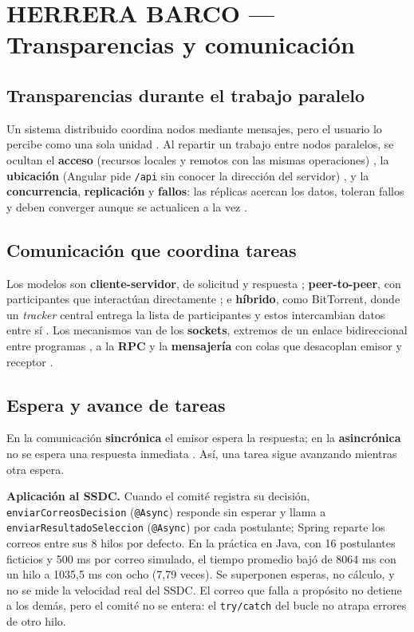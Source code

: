 \section*{HERRERA BARCO — Transparencias y comunicación}

\subsection*{Transparencias durante el trabajo paralelo}
Un sistema distribuido coordina nodos mediante mensajes, pero el usuario lo
percibe como una sola unidad \cite{hbFreitas2025}. Al repartir un trabajo
entre nodos paralelos, se ocultan el \textbf{acceso} (recursos locales y
remotos con las mismas operaciones) \cite{hbArjona2023}, la
\textbf{ubicación} (Angular pide \texttt{/api} sin conocer la dirección del
servidor) \cite{hbAngularProxy}, y la \textbf{concurrencia},
\textbf{replicación} y \textbf{fallos}: las réplicas acercan los datos, toleran
fallos y deben converger aunque se actualicen a la vez \cite{hbFreitas2025}.

\subsection*{Comunicación que coordina tareas}
Los modelos son \textbf{cliente-servidor}, de solicitud y respuesta
\cite{hbSimoes2026}; \textbf{peer-to-peer}, con participantes que interactúan
directamente \cite{hbSaleh2025}; e \textbf{híbrido}, como BitTorrent, donde un
\emph{tracker} central entrega la lista de participantes y estos intercambian
datos entre sí \cite{hbBep3}. Los mecanismos van de los \textbf{sockets},
extremos de un enlace bidireccional entre programas \cite{hbOracleSockets}, a
la \textbf{RPC} \cite{hbSimoes2026} y la \textbf{mensajería} con colas que
desacoplan emisor y receptor \cite{hbSaleh2025}.

\subsection*{Espera y avance de tareas}
En la comunicación \textbf{sincrónica} el emisor espera la respuesta; en la
\textbf{asincrónica} no se espera una respuesta inmediata \cite{hbSimoes2026}.
Así, una tarea sigue avanzando mientras otra espera.

\textbf{Aplicación al SSDC.} Cuando el comité registra su decisión,
\texttt{enviarCorreosDecision} (\texttt{@Async}) responde sin esperar y llama a
\texttt{enviarResultadoSeleccion} (\texttt{@Async}) por cada postulante; Spring
reparte los correos entre sus 8 hilos por defecto. En la práctica en Java, con
16 postulantes ficticios y 500 ms por correo simulado, el tiempo promedio bajó
de 8064 ms con un hilo a 1035,5 ms con ocho (7,79 veces). Se superponen
esperas, no cálculo, y no se mide la velocidad real del SSDC. El correo que
falla a propósito no detiene a los demás, pero el comité no se entera: el
\texttt{try/catch} del bucle no atrapa errores de otro hilo.
